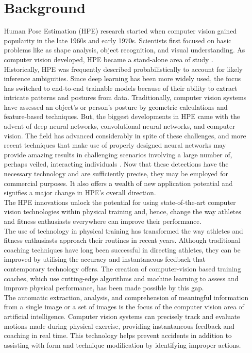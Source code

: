 \section{Background}
    Human Pose Estimation (HPE) research started when computer vision gained popularity in the late 1960s and early 1970s. Scientists first focused on basic problems like as shape analysis, object recognition, and visual understanding. As computer vision developed, HPE became a stand-alone area of study \citep{Roboflow}. Historically, HPE was frequently described probabilistically to account for likely inference ambiguities. Since deep learning has been more widely used, the focus has switched to end-to-end trainable models because of their ability to extract intricate patterns and postures from data. Traditionally, computer vision systems have assessed an object's or person's posture by geometric calculations and feature-based techniques. But, the biggest developments in HPE came with the advent of deep neural networks, convolutional neural networks, and computer vision. The field has advanced considerably in spite of these challenges, and more recent techniques that make use of properly designed neural networks may provide amazing results in challenging scenarios involving a large number of, perhaps veiled, interacting individuals \citep{liu2018recognizing}. Now that these detections have the necessary technology and are sufficiently precise, they may be employed for commercial purposes. It also offers a wealth of new application potential and signifies a major change in HPE's overall direction.\\
    The HPE innovations unlock the potential for using state-of-the-art computer vision technologies within physical training and, hence, change the way athletes and fitness enthusiasts everywhere can improve their performance.\\
    The use of technology in physical training has transformed the way athletes and fitness enthusiasts approach their routines in recent years. Although traditional coaching techniques have long been successful in directing athletes, they can be improved by utilising the accuracy and instantaneous feedback that contemporary technology offers. The creation of computer-vision based training coaches, which use cutting-edge algorithms and machine learning to assess and improve physical performance, has been made possible by this gap. \citep{debnath2022review}\\
    The automatic extraction, analysis, and comprehension of meaningful information from a single image or a set of images is the focus of the computer vision area of artificial intelligence. Computer vision systems can precisely track and evaluate motions made during physical exercise, providing instantaneous feedback and coaching in real time. This technology helps prevent accidents in addition to assisting with form and technique modification by identifying improper actions. \citep{borisov2023application}\\
